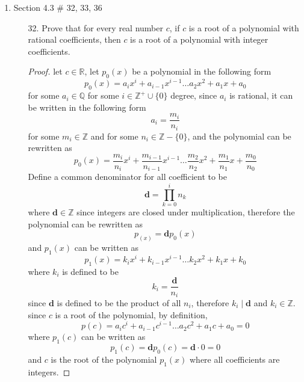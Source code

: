 \documentclass[12pt]{article}
\newcommand{\Z}{\mathbb{Z}}
\newcommand{\R}{\mathbb{R}}
\newcommand{\Q}{\mathbb{Q}}
\newcommand{\zero}{\{0\}}
\begin{document}
\begin{enumerate}
        \item Section 4.3 \# 32, 33, 36
            \begin{enumerate}
                \item[32.] Prove that for every real number $c$, if $c$ is a root of a polynomial with rational coefficients, then $c$ is a root of a polynomial with integer coefficients. 
                \begin{proof}
                    let $c \in \R$, let $p_0(x)$ be a polynomial in the following form
                    \[
                    p_0(x) = a_ix^i + a_{i-1}x^{i-1} \ldots a_2x^2 + a_1x +a_0
                    \]
                    for some $a_i \in \Q$ for some $i \in \Z^+ \cup \zero$ degree, since $a_i$ is rational, it can be written in the following form
                    \[
                    a_i =\frac{m_i}{n_i}
                    \]
                    for some $m_i \in \Z$ and for some $n_i \in \Z - \zero$, and the polynomial can be rewritten as 
                    \[
                    p_0(x) = \frac{m_i}{n_i}x^i + \frac{m_{i-1}}{n_{i-1}}x^{i-1} \ldots \frac{m_2}{n_2}x^2 + \frac{m_1}{n_1}x + \frac{m_0}{n_0}
                    \]
                    Define a common denominator for all coefficient to be
                    \[
                    \mathbf{d} = \prod_{k=0}^{i}n_k
                    \]
                    where $\mathbf{d} \in \Z$ since integers are closed under multiplication, therefore the polynomial can be rewritten as
                    \[
                    p_(x) = \mathbf{d}p_0(x)
                    \]
                    and $p_1(x)$ can be written as 
                    \[
                    p_1(x) = k_ix^i + k_{i-1}x^{i-1} \ldots k_2x^2 + k_1x +k_0
                    \]
                    where $k_i$ is defined to be
                    \[
                    k_i = \frac{\mathbf{d}}{n_i}
                    \]
                    since $\mathbf{d}$ is defined to be the product of all $n_i$, therefore $k_i \mid \mathbf{d}$ and $k_i \in \Z$.
                    since $c$ is a root of the polynomial, by definition,
                    \[
                    p(c) = a_ic^i + a_{i-1}c^{i-1} \ldots a_2c^2 + a_1c +a_0 = 0
                    \]
                    where $p_1(c)$ can be written as 
                    \[
                    p_1(c) = \mathbf{d}p_0(c) = \mathbf{d} \cdot 0 = 0
                    \]
                    and $c$ is the root of the polynomial $p_1(x)$ where all coefficients are integers.

                    
                \end{proof}
                \newpage


\end{enumerate}
\end{enumerate}
\end{document}
